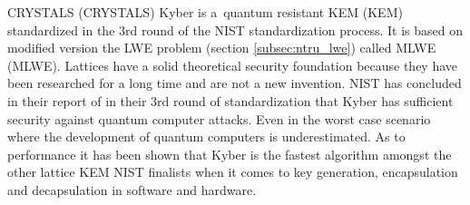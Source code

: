 CRYSTALS (\acl{CRYSTALS}) Kyber is a~quantum resistant KEM (\acl{KEM}) standardized in the 3rd round of the NIST standardization process. It is based on modified version the LWE problem (section \ref{subsec:ntru_lwe}) called MLWE (\acl{MLWE}). Lattices have a solid theoretical security foundation because they have been researched for a long time and are not a new invention. NIST has concluded in their report of in their 3rd round of standardization that Kyber has sufficient security against quantum computer attacks. Even in the worst case scenario where the development of quantum computers is underestimated. As to performance it has been shown that Kyber is the fastest algorithm amongst the other lattice KEM NIST finalists when it comes to key generation, encapsulation and decapsulation in software and hardware. \cite{Grimes2020}\cite{Alagic2022}
